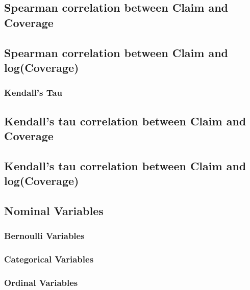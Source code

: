 \documentclass[]{book}
\theoremstyle{definition}
\theoremstyle{definition}
\theoremstyle{definition}
\theoremstyle{remark}
\begin{document}
\subsection{Spearman correlation between Claim and
Coverage}\label{spearman-correlation-between-claim-and-coverage}

\subsection{Spearman correlation between Claim and
log(Coverage)}\label{spearman-correlation-between-claim-and-logcoverage}

\subsubsection{Kendall's Tau}\label{kendalls-tau}

\subsection{Kendall's tau correlation between Claim and
Coverage}\label{kendalls-tau-correlation-between-claim-and-coverage}

\subsection{Kendall's tau correlation between Claim and
log(Coverage)}\label{kendalls-tau-correlation-between-claim-and-logcoverage}

\subsection{Nominal Variables}\label{nominal-variables}

\subsubsection{Bernoulli Variables}\label{bernoulli-variables}

\subsubsection{Categorical Variables}\label{categorical-variables}

\subsubsection{Ordinal Variables}\label{ordinal-variables}
\end{document}
